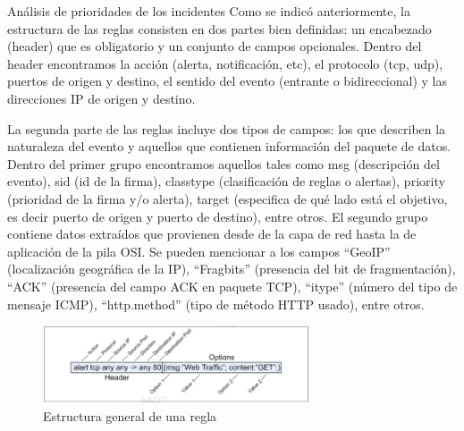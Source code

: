     \begin{section}{Análisis de prioridades de los incidentes}
    Como se indicó anteriormente, la estructura de las reglas consisten en dos partes bien definidas: un encabezado (header) que es obligatorio  y un conjunto de campos opcionales. Dentro del header encontramos la acción (alerta, notificación, etc), el protocolo (tcp, udp), puertos de origen y destino, el sentido del evento (entrante o bidireccional) y las direcciones IP de origen y destino. \par
    La segunda parte de las reglas incluye dos tipos de campos: los que describen la naturaleza del evento y aquellos que contienen información del paquete de datos. Dentro del primer grupo encontramos aquellos tales como msg (descripción del evento), sid (id de la firma), classtype (clasificación de reglas o alertas), priority (prioridad de la firma y/o alerta), target (especifica de qué lado está el objetivo, es decir puerto de origen y puerto de destino), entre otros. El segundo grupo contiene datos extraídos que provienen desde de la capa de red hasta la de aplicación de la pila OSI. Se pueden mencionar a los campos “GeoIP” (localización geográfica de la IP), “Fragbits” (presencia del bit de fragmentación), “ACK” (presencia del campo ACK en paquete TCP), “itype” (número del tipo de mensaje ICMP), “http.method” (tipo de método HTTP usado), entre otros.
     \begin{figure}[H]
        \centering
        \includegraphics[width=0.7\textwidth]{./iteracion_3_imagenes/figura_41_estructura_regla.png}
        \caption{Estructura general de una regla}
        \label{fig:figura_41_estruc_regla}
     \end{figure}
    

\end{section}
